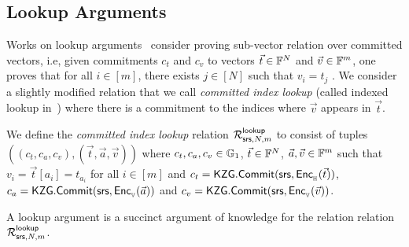 
 


\subsection{Lookup Arguments}
Works on lookup arguments~\cite{CCS:ZBKMNS22,EPRINT:PosKat22,EPRINT:ZGKMR22,EPRINT:EagFioGab22}
consider proving sub-vector relation over committed vectors, i.e, given commitments $c_t$ and $c_v$ to vectors $\vec{t}\in \mathbb{F}^N$
and $\vec{v}\in \mathbb{F}^m$, one proves that for all $i\in [m]$, there exists $j\in [N]$ such that $v_i=t_j$ .
We consider a slightly modified relation that we call {\em committed index lookup} (called indexed lookup in~\cite{lasso})  where there is a commitment to the indices where $\vec{v}$ appears in $\vec{t}$.

\begin{definition}
\label{defn:comm-index-lookup}
We define the {\em committed index lookup} relation $\mathcal{R}^{\mathsf{lookup}}_{\mathsf{srs},N,m}$ to consist of tuples
$((c_t,c_a,c_v),(\vec{t},\vec{a},\vec{v}))$ where $c_t,c_a,c_v\in \mathbb{G}_1$, $\vec{t}\in \mathbb{F}^N$, $\vec{a},\vec{v}\in \mathbb{F}^m$ such
that $v_i = \vec{t}[a_i]=t_{a_i}$ for all $i\in [m]$ and $c_t = \mathsf{KZG.Commit}(\mathsf{srs}, \mathsf{Enc}_{{}_{\mathbb{H}}}(\vec{t}))$, $c_a=\mathsf{KZG.Commit}(\mathsf{srs},\mathsf{Enc}_{{}_{\mathbb{V}}}(\vec{a}))$
and $c_v=\mathsf{KZG.Commit}(\mathsf{srs},\mathsf{Enc}_{{}_{\mathbb{V}}}(\vec{v}))$.
\end{definition}

A lookup argument is a succinct argument of knowledge for the relation relation $\mathcal{R}^{\mathsf{lookup}}_{\mathsf{srs},N,m}$. 